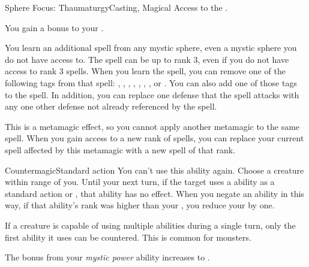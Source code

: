   \begin{magicalfeat}{Sphere Focus: Thaumaturgy}{Casting, Magical}
    \featpre Access to the  .

     You gain a  bonus to your .

     You learn an additional spell from any mystic sphere, even a mystic sphere you do not have access to.
    The spell can be up to rank 3, even if you do not have access to rank 3 spells.
    When you learn the spell, you can remove one of the following tags from that spell: \atAcid, \atAuditory, \atCold, \atCompulsion, \atEmotion, \atElectricity, \atFire, or \atVisual.
    You can also add one of those tags to the spell.
    In addition, you can replace one defense that the spell attacks with any one other defense not already referenced by the spell.

    This is a metamagic effect, so you cannot apply another metamagic to the same spell.
    When you gain access to a new rank of spells, you can replace your current spell affected by this metamagic with a new spell of that rank.

    \begin{magicalactiveability}{Countermagic}{Standard action}
      \abilitytags {}
      \abilitycost You \briefly can't use this ability again.
      \rankline
      Choose a creature within \rngmed range of you.
      Until your next turn, if the target uses a \magical ability as a standard action or , that ability has no effect.
      When you negate an ability in this way, if that ability's rank was higher than your , you reduce your  by one.

      If a creature is capable of using multiple abilities during a single turn, only the first ability it uses can be countered.
      This is common for  monsters.
    \end{magicalactiveability}

     The bonus from your \textit{mystic power} ability increases to .
  \end{magicalfeat}

